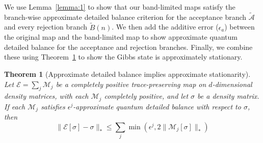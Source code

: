 \documentclass[aps,floatfix,10pt,amssymb,amsfont,amsmath,superscriptaddress,float,nofootinbib,longbibliography,nobalancelastpage,twocolumn]{revtex4-2}
\newtheorem{theorem}{Theorem}
\begin{document}
We use Lemma~\ref{lemma:1} to show that our band-limited maps satisfy the branch-wise approximate detailed balance
criterion for the acceptance branch $\tilde{\mathcal{A}}$ and every rejection branch $\tilde{B}(n)$. We then add the additive error ($\epsilon_a$) between the original map and the band-limited map to show approximate quantum detailed balance for the acceptance and rejection branches. Finally, we combine these using Theorem~\ref{theorem:quantumapproximatedeatildedbalance} to show the Gibbs state is approximately stationary.
\begin{theorem}[Approximate detailed balance implies approximate stationarity]
\label{theorem:quantumapproximatedeatildedbalance}
Let $\mathcal{E} = \sum_j \mathcal{M}_j$ be a completely positive trace-preserving map on $d$-dimensional density matrices, with each $\mathcal{M}_j$ completely positive, and let $\sigma$ be a density matrix. If each $\mathcal{M}_j$ satisfies $\epsilon^j$-approximate quantum detailed balance with respect to $\sigma$, then
\begin{equation}
     \|\mathcal{E}[\sigma]-\sigma\|_* \leq \sum_j\min\left(\epsilon^j, 2\|\mathcal{M}_j[\sigma]\|_*\right)
\end{equation}
\end{theorem}
\end{document}
